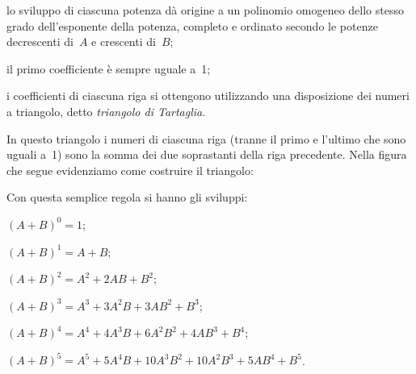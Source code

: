 \begin{itemize*}
\item lo sviluppo di ciascuna potenza dà origine a un polinomio
omogeneo dello stesso grado dell'esponente della
potenza, completo e ordinato secondo le potenze decrescenti di~$A$ e crescenti di~$B$;
\item il primo coefficiente è sempre uguale a~1;
\item i coefficienti di ciascuna riga si ottengono utilizzando una
disposizione dei numeri a triangolo, detto \emph{triangolo di Tartaglia}.
\end{itemize*}

\begin{center}

\end{center}

In questo triangolo i numeri di ciascuna riga (tranne il primo e
l'ultimo che sono uguali a~1) sono la somma dei due
soprastanti della riga precedente. Nella figura che segue evidenziamo
come costruire il triangolo:

\begin{center}

\end{center}


Con questa semplice regola si hanno gli sviluppi:

\begin{itemize*}
\item $(A+B)^{0}=1$;
\item $(A+B)^{1}=A+B$;
\item $(A+B)^{2}=A^{2}+2AB+B^{2}$;
\item $(A+B)^{3}=A^{3}+3A^{2}B+3AB^{2}+B^{3}$;
\item $(A+B)^{4}=A^{4}+4A^{3}B+6A^{2}B^{2}+4AB^{3}+B^{4}$;
\item $(A+B)^{5}=A^{5}+5A^{4}B+10A^{3}B^{2}+10A^{2}B^{3}+5AB^{4}+B^{5}$.
\end{itemize*}

\ovalbox{\risolvii \ref{ese:11.28}, \ref{ese:11.29}, \ref{ese:11.30}}
\newpage

\cleardoublepage
